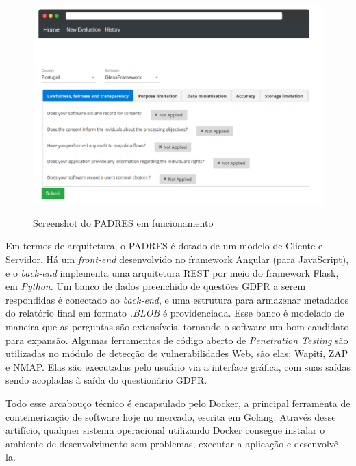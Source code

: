 \begin{figure}[ht]
    \centering
    \caption{Screenshot do PADRES em funcionamento}
    \includegraphics[width=14cm]{figuras/padres.png} 
    \label{fig:internet} 
\end{figure}

Em termos de arquitetura, o PADRES é dotado de um modelo de Cliente e Servidor. Há um \textit{front-end} desenvolvido no framework Angular (para JavaScript), e o \textit{back-end} implementa uma arquitetura REST por meio do framework Flask, em \textit{Python}. Um banco de dados preenchido de questões GDPR a serem respondidas é conectado ao \textit{back-end}, e uma estrutura para armazenar metadados do relatório final em formato \textit{.BLOB} é providenciada. Esse banco é modelado de maneira que as perguntas são extensíveis, tornando o software um bom candidato para expansão. Algumas ferramentas de código aberto de \textit{Penetration Testing} são utilizadas no módulo de detecção de vulnerabilidades Web, são elas: Wapiti, ZAP e NMAP. Elas são executadas pelo usuário via a interface gráfica, com suas saídas sendo acopladas à saída do questionário GDPR.

Todo esse arcabouço técnico é encapsulado pelo Docker, a principal ferramenta de conteinerização de software hoje no mercado, escrita em Golang. Através desse artifício, qualquer sistema operacional utilizando Docker consegue instalar o ambiente de desenvolvimento sem problemas, executar a aplicação e desenvolvê-la. 

